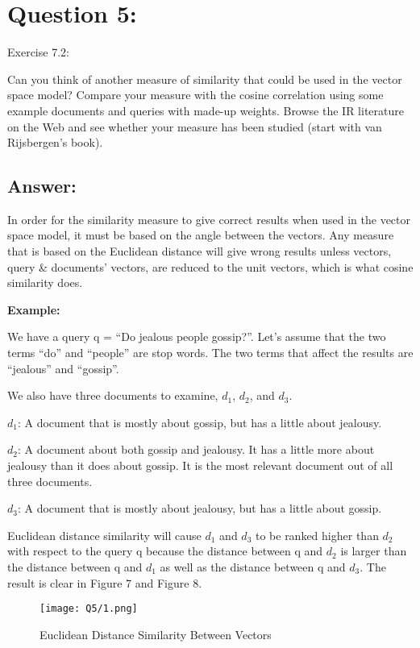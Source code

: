 \section*{Question 5:}
Exercise 7.2: 

Can you think of another measure of similarity that could be used in the vector space model? Compare your measure with the cosine correlation using some example documents and queries with made-up weights. Browse the IR literature on the Web and see whether your measure has been studied (start with van Rijsbergen’s book).

\subsection*{Answer:}

In order for the similarity measure to give correct results when used in the vector space model, it must be based on the angle between the vectors. Any measure that is based on the Euclidean distance will give wrong results unless vectors, query \& documents' vectors, are reduced to the unit vectors, which is what cosine similarity does.

\textbf{Example:}

We have a query q = ``Do jealous people gossip?''. Let's assume that the two terms ``do'' and ``people'' are stop words. The two terms that affect the results are ``jealous'' and ``gossip''.

We also have three documents to examine, $d_1$, $d_2$, and $d_3$.

$d_1$: A document that is mostly about gossip, but has a little about jealousy.

$d_2$: A document about both gossip and jealousy. It has a little more about jealousy than it does about gossip. It is the most relevant document out of all three documents.

$d_3$: A document that is mostly about jealousy, but has a little about gossip.

Euclidean distance similarity will cause $d_1$ and $d_3$ to be ranked higher than $d_2$ with respect to the query q because the distance between q and $d_2$ is larger than the distance between q and $d_1$ as well as the distance between q and $d_3$. The result is clear in Figure 7 and Figure 8.

\begin{figure}[h]
\caption{Euclidean Distance Similarity Between Vectors}
\centering
\texttt{[image: Q5/1.png]}
\end{figure}


